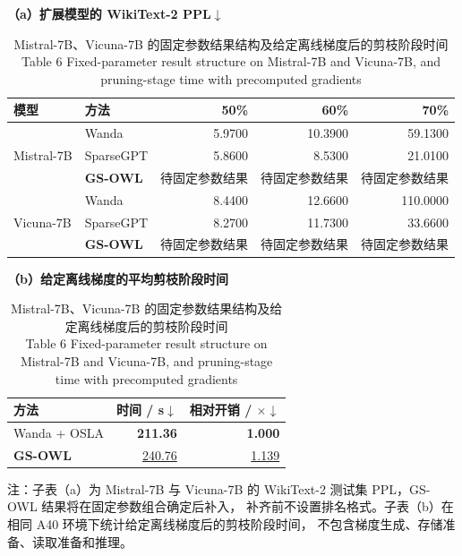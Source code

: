 \documentclass[UTF8,fontset=fandol]{ctexart}
\renewcommand{\arraystretch}{1.08}
\newcommand{\best}[1]{\textbf{#1}}
\newcommand{\second}[1]{\underline{#1}}
\begin{document}
\begin{table}[!htbp]
\centering
\caption{Mistral-7B、Vicuna-7B 的固定参数结果结构及给定离线梯度后的剪枝阶段时间\\
Table 6 Fixed-parameter result structure on Mistral-7B and Vicuna-7B, and pruning-stage time with precomputed gradients}
\label{tab:generalization}
\begin{minipage}{0.62\textwidth}
\centering
\scriptsize
\textbf{（a）扩展模型的 WikiText-2 PPL$\downarrow$}\par\vspace{2pt}
\setlength{\tabcolsep}{3.4pt}
\renewcommand{\arraystretch}{0.98}
\begin{tabular}{llrrr}
\toprule
模型 & 方法 & 50\% & 60\% & 70\% \\
\midrule
\multirow{3}{*}{Mistral-7B}
 & Wanda & 5.9700 & 10.3900 & 59.1300 \\
 & SparseGPT & 5.8600 & 8.5300 & 21.0100 \\
 & \textbf{GS-OWL} & 待固定参数结果 & 待固定参数结果 & 待固定参数结果 \\
\midrule
\multirow{3}{*}{Vicuna-7B}
 & Wanda & 8.4400 & 12.6600 & 110.0000 \\
 & SparseGPT & 8.2700 & 11.7300 & 33.6600 \\
 & \textbf{GS-OWL} & 待固定参数结果 & 待固定参数结果 & 待固定参数结果 \\
\bottomrule
\end{tabular}
\end{minipage}
\hfill
\begin{minipage}{0.34\textwidth}
\centering
\scriptsize
\textbf{（b）给定离线梯度的平均剪枝阶段时间}\par\vspace{2pt}
\setlength{\tabcolsep}{3.6pt}
\renewcommand{\arraystretch}{1.00}
\begin{tabular}{lrr}
\toprule
方法 & 时间 / s$\downarrow$ & 相对开销 / $\times$$\downarrow$ \\
\midrule
Wanda + OSLA & \best{211.36} & \best{1.000} \\
\textbf{GS-OWL} & \second{240.76} & \second{1.139} \\
\bottomrule
\end{tabular}
\end{minipage}
\vspace{2pt}
\parbox{0.96\textwidth}{\scriptsize
注：子表（a）为 Mistral-7B 与 Vicuna-7B 的 WikiText-2 测试集 PPL，GS-OWL 结果将在固定参数组合确定后补入，
补齐前不设置排名格式。子表（b）在相同 A40 环境下统计给定离线梯度后的剪枝阶段时间，
不包含梯度生成、存储准备、读取准备和推理。}
\end{table}
\end{document}

